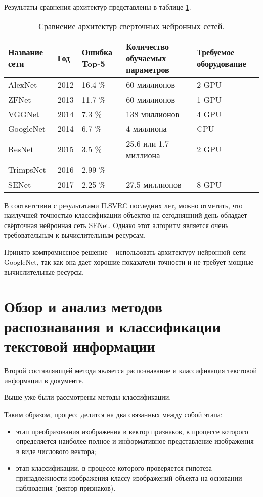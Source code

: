 Результаты сравнения архитектур представлены в таблице \ref{table:cnncompare}.

\begin{table}[H]
\caption{Сравнение архитектур сверточных нейронных сетей. }
\begin{tabular}{|p{2.5cm}|p{1.5cm}|p{2cm}|p{5cm}|p{4cm}|}
\hline
Название сети \cite{cnn} & Год & Ошибка Top-5 & Количество обучаемых параметров \cite{numparams} & Требуемое оборудование \cite{gpu} \\ \hline
AlexNet       & 2012 & 16.4 \%  & 60 миллионов  & 2 GPU \\ \hline
ZFNet         & 2013 & 11.7 \%   & 60 миллионов   & 1 GPU \\ \hline
VGGNet        & 2014 & 7.3 \%    & 138 миллионов  & 4 GPU \\ \hline
GoogleNet     & 2014 & 6.7 \%    & 4 миллиона & CPU \\ \hline
ResNet        & 2015 & 3.5 \%    & 25.6 или 1.7 миллиона  & 2 GPU \\ \hline
TrimpsNet     & 2016 & 2.99 \%   &  & \\ \hline
SENet         & 2017 & 2.25 \%   & 27.5 миллионов  & 8 GPU \\ \hline
\end{tabular}
\label{table:cnncompare}
\end{table}

В соответствии с результатами ILSVRC последних лет, можно отметить, что наилучшей точностью классификации объектов на сегодняшний день обладает свёрточная нейронная сеть SENet. Однако этот алгоритм является очень требовательным к вычислительным ресурсам.

Принято компромиссное решение -- использовать архитектуру нейронной сети GoogleNet, так как она дает хорошие показатели точности и не требует мощные вычислительные ресурсы.

\section{Обзор и анализ методов распознавания и классификации текстовой информации}

Второй составляющей метода является распознавание и классификация текстовой информации в документе.

Выше уже были рассмотрены методы классификации.

Таким образом, процесс делится на два связанных между собой этапа:

\begin{itemize}
\item этап преобразования изображения в вектор признаков, в процессе которого определяется наиболее полное и информативное представление изображения в виде числового вектора;
\item этап классификации, в процессе которого проверяется гипотеза принадлежности изображения классу изображений объекта на основании наблюдения (вектор признаков).
\end{itemize}

